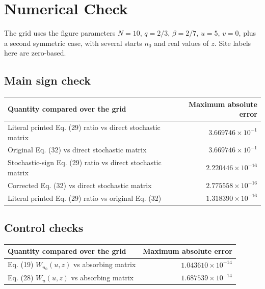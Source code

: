 \documentclass[11pt]{article}
\begin{document}
\section*{Numerical Check}

The grid uses the figure parameters \(N=10\), \(q=2/3\), \(\beta=2/7\),
\(u=5\), \(v=0\), plus a second symmetric case, with several starts \(n_0\)
and real values of \(z\).  Site labels here are zero-based.

\subsection*{Main sign check}

\begin{center}
\begin{tabularx}{0.98\linewidth}{@{}Xr@{}}
\toprule
Quantity compared over the grid & Maximum absolute error \\
\midrule
Literal printed Eq. (29) ratio vs direct stochastic matrix & \(3.669746\times10^{-1}\) \\
Original Eq. (32) vs direct stochastic matrix & \(3.669746\times10^{-1}\) \\
Stochastic-sign Eq. (29) ratio vs direct stochastic matrix & \(2.220446\times10^{-16}\) \\
Corrected Eq. (32) vs direct stochastic matrix & \(2.775558\times10^{-16}\) \\
Literal printed Eq. (29) ratio vs original Eq. (32) & \(1.318390\times10^{-16}\) \\
\bottomrule
\end{tabularx}
\end{center}

\subsection*{Control checks}

\begin{center}
\begin{tabularx}{0.98\linewidth}{@{}Xr@{}}
\toprule
Quantity compared over the grid & Maximum absolute error \\
\midrule
Eq. (19) \(W_{n_0}(u,z)\) vs absorbing matrix & \(1.043610\times10^{-14}\) \\
Eq. (28) \(W_u(u,z)\) vs absorbing matrix & \(1.687539\times10^{-14}\) \\
\bottomrule
\end{tabularx}
\end{center}
\end{document}
